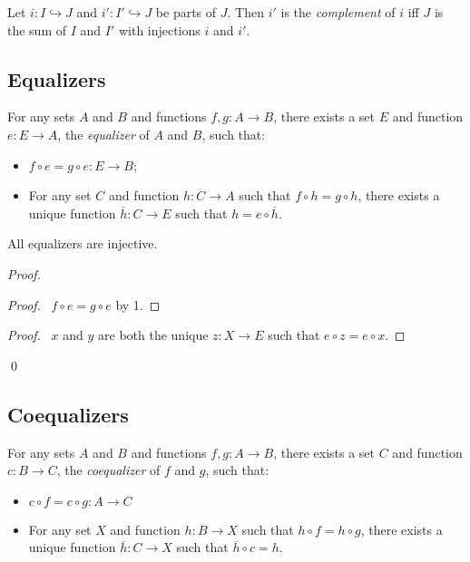   \begin{df}[Complement]
 Let $i : I \hookrightarrow J$ and $i' : I' \hookrightarrow J$ be parts of
 $J$. Then $i'$ is the \emph{complement} of $i$ iff $J$ is the sum of $I$ and
 $I'$ with injections $i$ and $i'$.
\end{df}


\subsection{Equalizers}

\begin{ax}[Equalizers]
  For any sets $A$ and $B$ and functions $f, g : A \rightarrow B$, there
  exists a set $E$ and function $e : E \rightarrow A$, the \emph{equalizer}
  of
  $A$ and $B$, such that:
  \begin{itemize}
    \item $f \circ e = g \circ e : E \rightarrow B$;
    \item For any set $C$ and function $h : C \rightarrow A$ such that $f
    \circ h
    = g \circ h$, there exists a unique function $\overline{h} : C
    \rightarrow
    E$
    such that $h = e \circ \overline{h}$.
  \end{itemize}
\end{ax}

\begin{prop}
  \label{prop:set_theory:equalizer:injective}
 All equalizers are injective.
\end{prop}

\begin{proof}
 \pf
 \begin{proof}
   \pf\ $f \circ e = g \circ e$ by 1.
 \end{proof}
 \begin{proof}
   \pf\ $x$ and $y$ are both the unique $z : X \rightarrow E$ such that $e
   \circ z = e \circ x$.
 \end{proof}
 \qed
\end{proof}

\subsection{Coequalizers}

\begin{ax}[Coequalizers]
  For any sets $A$ and $B$ and functions $f, g : A \rightarrow B$, there
  exists a set $C$ and function $c : B \rightarrow C$, the \emph{coequalizer}
  of $f$ and $g$, such that:
  \begin{itemize}
    \item $c \circ f = c \circ g : A \rightarrow C$
    \item For any set $X$ and function $h : B \rightarrow X$ such that $h
    \circ f
    = h \circ g$, there exists a unique function $\overline{h} : C
    \rightarrow
    X$
    such that $\overline{h} \circ c = h$.
  \end{itemize}
\end{ax}


